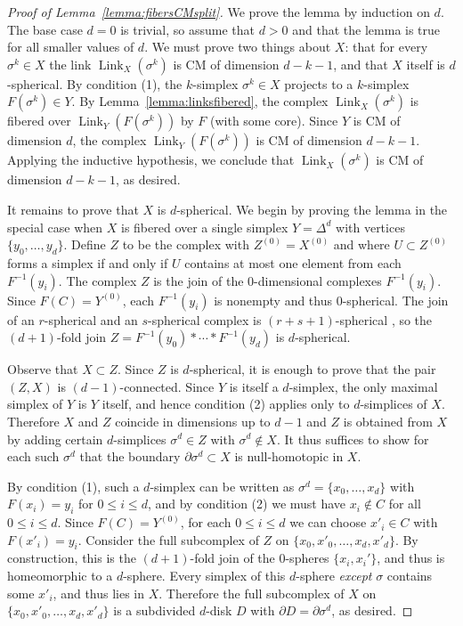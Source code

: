 \documentclass[11 pt]{article}
\theoremstyle{plain}
\theoremstyle{definition}
\numberwithin{equation}{section}
\DeclareMathOperator{\Link}{Link}
\begin{document}
\begin{proof}[Proof of Lemma~\ref{lemma:fibersCMsplit}]
We prove the lemma by induction on $d$.  The base case $d=0$ is trivial, so assume that $d>0$ and that the
lemma is true for all smaller values of $d$.  We must prove two things about $X$: that for every $\sigma^k\in X$ the link $\Link_X(\sigma^k)$ is CM of dimension $d-k-1$, and that $X$ itself is $d$-spherical. By condition (1), the $k$-simplex $\sigma^k\in X$ projects to a $k$-simplex $F(\sigma^k)\in Y$. By Lemma~\ref{lemma:linksfibered}, the complex $\Link_X(\sigma^k)$ is fibered over $\Link_Y(F(\sigma^k))$ by $F$ (with some core). Since $Y$ is CM of dimension $d$, the complex $\Link_Y(F(\sigma^k))$ is CM of dimension $d-k-1$. Applying the inductive hypothesis, we conclude that $\Link_X(\sigma^k)$ is CM of dimension $d-k-1$, as desired.

It remains to prove that $X$ is $d$-spherical. We begin by proving the lemma in the special case when $X$ is fibered over a single simplex $Y=\Delta^d$ with vertices $\{y_0,\ldots,y_d\}$.  Define $Z$ to be the complex with $Z^{(0)}=X^{(0)}$
and where $U \subset Z^{(0)}$ forms a simplex if and only if $U$ contains at most one element from each
$F^{-1}(y_i)$.  The complex $Z$ is the join of the $0$-dimensional complexes $F^{-1}(y_i)$.
Since $F(C)=Y^{(0)}$, each $F^{-1}(y_i)$ is nonempty and thus $0$-spherical.  The join of an $r$-spherical 
and an $s$-spherical complex is $(r+s+1)$-spherical \cite[Example 8.1]{QuillenPoset},
so the $(d+1)$-fold join $Z=F^{-1}(y_0)\ast\cdots\ast F^{-1}(y_d)$ is $d$-spherical.

Observe that $X \subset Z$.  Since $Z$ is $d$-spherical, it is enough to prove that the
pair $(Z,X)$ is $(d-1)$-connected.
Since $Y$ is itself a $d$-simplex, the only maximal simplex of $Y$ is $Y$ itself, and hence
condition (2) applies only to $d$-simplices of $X$.  Therefore $X$ and $Z$ coincide in dimensions up to $d-1$ 
and $Z$ is obtained from $X$ by adding certain $d$-simplices $\sigma^d\in Z$ with $\sigma^d\not\in X$. 
It thus suffices to show for each such $\sigma^d$ that the boundary $\partial \sigma^d\subset X$ is null-homotopic in $X$.

By condition (1), such a $d$-simplex can be written as $\sigma^d=\{x_0,\ldots,x_d\}$ with $F(x_i)=y_i$ for $0 \leq i \leq d$, 
and by condition (2) we must have $x_i\not\in C$ for all $0 \leq i \leq d$.  Since $F(C)= Y^{(0)}$, for each $0 \leq i \leq d$
we can choose $x'_i\in C$ with $F(x'_i)=y_i$.  Consider the full subcomplex of $Z$ on $\{x_0,x'_0,\ldots,x_d,x'_d\}$.  By
construction, this is the $(d+1)$-fold join of the $0$-spheres $\{x_i,x_i'\}$, and thus is homeomorphic to a $d$-sphere.  Every simplex of this $d$-sphere \emph{except} 
$\sigma$ contains some $x'_i$, and thus lies in $X$.  Therefore the full subcomplex of $X$ on $\{x_0,x'_0,\ldots,x_d,x'_d\}$ 
is a subdivided $d$-disk $D$ with $\partial D=\partial \sigma^d$, as desired.


\end{proof}
\end{document}
